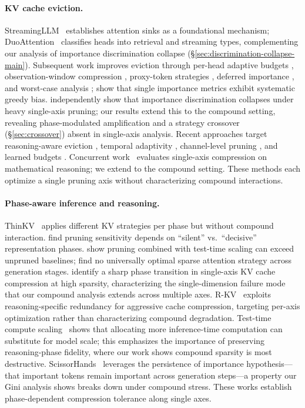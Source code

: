 \paragraph{KV cache eviction.}
StreamingLLM~\cite{streamingllm-iclr2024} establishes attention sinks as a foundational mechanism; DuoAttention~\cite{duoattention-2024} classifies heads into retrieval and streaming types, complementing our analysis of importance discrimination collapse (\S\ref{sec:discrimination-collapse-main}). Subsequent work improves eviction through per-head adaptive budgets \cite{adakv-neurips2025}, observation-window compression \cite{snapkv-neurips2024}, proxy-token strategies \cite{nacl-acl2024}, deferred importance \cite{retentivekv-2026}, and worst-case analysis \cite{defensivekv-iclr2026}; \cite{greedy-bias-kvcache-2026} show that single importance metrics exhibit systematic greedy bias. \cite{hies-2025} independently show that importance discrimination collapses under heavy single-axis pruning; our results extend this to the compound setting, revealing phase-modulated amplification and a strategy crossover (\S\ref{sec:crossover}) absent in single-axis analysis.
Recent approaches target reasoning-aware eviction \cite{rlkv-2025, longflow-2026, dong2026foresightkv}, temporal adaptivity \cite{lethe-aaai2026}, channel-level pruning \cite{xu2025think, spark-aaai2026}, and learned budgets \cite{lkv-2026}. Concurrent work~\citep{hold-onto-thought-neurips2025} evaluates single-axis compression on mathematical reasoning; we extend to the compound setting.
These methods each optimize a single pruning axis without characterizing compound interactions.

\paragraph{Phase-aware inference and reasoning.}
ThinKV~\cite{thinkv-iclr2026} applies different KV strategies per phase but without compound interaction.
\cite{decision-repr-transition-2026} find pruning sensitivity depends on ``silent'' vs.\ ``decisive'' representation phases.
\cite{doing-more-with-less-2026} show pruning combined with test-time scaling can exceed unpruned baselines; \cite{sparse-frontier-2025} find no universally optimal sparse attention strategy across generation stages.
\cite{physics-kvcache-2026} identify a sharp phase transition in single-axis KV cache compression at high sparsity, characterizing the single-dimension failure mode that our compound analysis extends across multiple axes.
R-KV~\cite{rkv-neurips2025} exploits reasoning-specific redundancy for aggressive cache compression, targeting per-axis optimization rather than characterizing compound degradation.
Test-time compute scaling~\cite{snell-2024-scaling-test-time} shows that allocating more inference-time computation can substitute for model scale; this emphasizes the importance of preserving reasoning-phase fidelity, where our work shows compound sparsity is most destructive.
ScissorHands~\cite{scissorhands-2023} leverages the persistence of importance hypothesis---that important tokens remain important across generation steps---a property our Gini analysis shows breaks down under compound stress.
These works establish phase-dependent compression tolerance along single axes.

